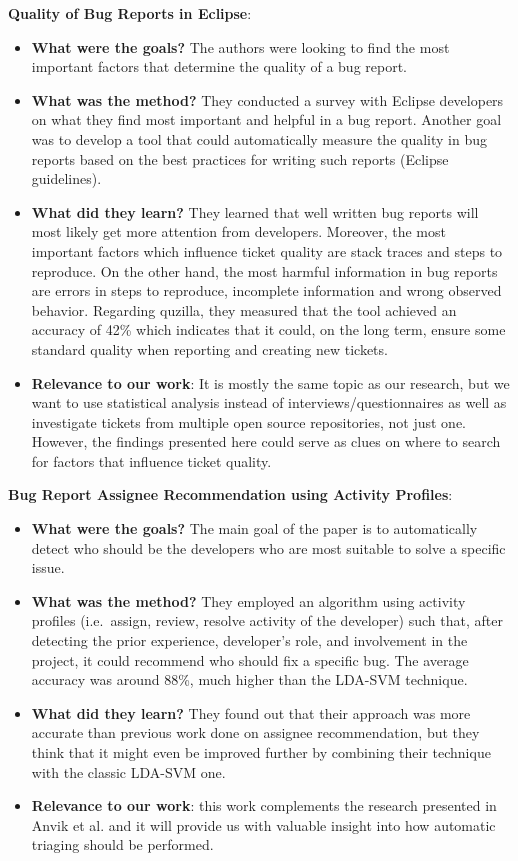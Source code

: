 \documentclass{mprop}
\begin{document}
\textbf{Quality of Bug Reports in Eclipse}\cite{bettenburg2007quality}:
\begin{itemize}
  \item \textbf{What were the goals?}
  The authors were looking to find the most important factors that determine the quality of a bug report. 
  \item \textbf{What was the method?}
  They conducted a survey with Eclipse developers on what they find most important and helpful in a bug report. Another goal was to develop a tool that could  automatically measure the quality in bug reports based on the best practices for writing such reports (Eclipse guidelines). 
  \item \textbf{What did they learn?}
  They learned that well written bug reports will most likely get more attention from developers. Moreover, the most important factors which influence  ticket quality are stack traces and steps to reproduce. On the other hand, the most harmful information in bug reports are errors in steps to reproduce, incomplete information and wrong observed behavior. Regarding quzilla, they measured that the tool achieved an accuracy of 42\% which indicates that it could, on the long term, ensure some standard quality when reporting and creating new tickets. 
  \item \textbf{Relevance to our work}:
  It is mostly the same topic as our research, but we want to use statistical analysis instead of interviews/questionnaires as well as investigate tickets from multiple open source repositories, not just one. However, the findings presented here could serve as clues on where to search for factors that influence ticket quality. 
\end{itemize}

\textbf{Bug Report Assignee Recommendation using 
Activity Profiles}\cite{Naguib2013BugReportAssignee}:
\begin{itemize}
  \item \textbf{What were the goals?}
    The main goal of the paper is to automatically detect who should be
    the developers who are most suitable to solve a specific issue.
  \item \textbf{What was the method?}
    They employed an algorithm using activity profiles (i.e.\ assign, review,
    resolve activity of the developer) such that, after detecting the prior
    experience, developer's role, and involvement in the project, it could
    recommend who should fix a specific bug. The average accuracy was around
    88\%, much higher than the LDA-SVM technique.
  \item \textbf{What did they learn?}
    They found out that their approach was more accurate than previous work
    done on assignee recommendation, but they think that it might even be
    improved further by combining their technique with the classic LDA-SVM one.
  \item \textbf{Relevance to our work}: this work complements the research
    presented in Anvik et al. \cite{anvik2006should} and it will provide us
    with valuable insight into how automatic triaging should be performed.
\end{itemize}
\end{document}
